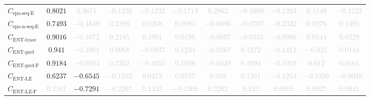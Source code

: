 \documentclass{standalone}
\newcommand{\enttracename}{\text{ENT-trace}}
\newcommand{\enttrace}{C_{\enttracename}}
\newcommand{\entprefixname}{\text{ENT-pref}}
\newcommand{\entprefix}{C_{\entprefixname}}
\newcommand{\entprefixflatname}{\text{ENT-pref-F}}
\newcommand{\entprefixflat}{C_{\entprefixflatname}}
\newcommand{\entlempelzivname}{\text{ENT-LZ}}
\newcommand{\entlempelziv}{C_{\entlempelzivname}}
\newcommand{\entlempelzivflatname}{\text{ENT-LZ-F}}
\newcommand{\entlempelzivflat}{C_{\entlempelzivflatname}}
\newcommand{\epasequenceename}{\text{epa-seq-E}}
\newcommand{\epasequencee}{C_{\epasequenceename}}
\newcommand{\epanormsequenceename}{\text{epa-n-seq-E}}
\newcommand{\epanormsequencee}{C_{\epanormsequenceename}}
\begin{document}
\begin{tabular}{lcccccccccc}
$\epasequencee$ & $0.8021$ & \textcolor{lightgray}{$0.3671$} & \textcolor{lightgray}{$-0.1236$} & \textcolor{lightgray}{$-0.1232$} & \textcolor{lightgray}{$-0.1713$} & \textcolor{lightgray}{$0.2862$} & \textcolor{lightgray}{$-0.1609$} & \textcolor{lightgray}{$-0.1283$} & \textcolor{lightgray}{$0.1148$} & \textcolor{lightgray}{$-0.1222$} \\ 
$\epanormsequencee$ & $0.7493$ & \textcolor{lightgray}{$-0.4849$} & \textcolor{lightgray}{$0.2288$} & \textcolor{lightgray}{$0.0268$} & \textcolor{lightgray}{$0.0983$} & \textcolor{lightgray}{$-0.0086$} & \textcolor{lightgray}{$-0.0707$} & \textcolor{lightgray}{$-0.2332$} & \textcolor{lightgray}{$0.0276$} & \textcolor{lightgray}{$0.1495$} \\ 
$\enttrace$ & $0.9016$ & \textcolor{lightgray}{$-0.1072$} & \textcolor{lightgray}{$0.2185$} & \textcolor{lightgray}{$0.1991$} & \textcolor{lightgray}{$0.0196$} & \textcolor{lightgray}{$-0.0697$} & \textcolor{lightgray}{$-0.0355$} & \textcolor{lightgray}{$-0.0986$} & \textcolor{lightgray}{$0.0144$} & \textcolor{lightgray}{$0.0229$} \\ 
$\entprefix$ & $0.941$ & \textcolor{lightgray}{$-0.1061$} & \textcolor{lightgray}{$0.0968$} & \textcolor{lightgray}{$-0.0837$} & \textcolor{lightgray}{$0.1234$} & \textcolor{lightgray}{$-0.0267$} & \textcolor{lightgray}{$0.1272$} & \textcolor{lightgray}{$-0.1412$} & \textcolor{lightgray}{$-0.021$} & \textcolor{lightgray}{$0.0144$} \\ 
$\entprefixflat$ & $0.9184$ & \textcolor{lightgray}{$-0.0594$} & \textcolor{lightgray}{$0.2352$} & \textcolor{lightgray}{$-0.1055$} & \textcolor{lightgray}{$0.1698$} & \textcolor{lightgray}{$-0.0449$} & \textcolor{lightgray}{$0.1094$} & \textcolor{lightgray}{$-0.1019$} & \textcolor{lightgray}{$0.012$} & \textcolor{lightgray}{$0.0161$} \\ 
$\entlempelziv$ & $0.6237$ & $-0.6545$ & \textcolor{lightgray}{$-0.1292$} & \textcolor{lightgray}{$0.0473$} & \textcolor{lightgray}{$0.0737$} & \textcolor{lightgray}{$0.018$} & \textcolor{lightgray}{$0.1261$} & \textcolor{lightgray}{$-0.1253$} & \textcolor{lightgray}{$-0.1356$} & \textcolor{lightgray}{$-0.0039$} \\ 
$\entlempelzivflat$ & \textcolor{lightgray}{$0.2161$} & $-0.7291$ & \textcolor{lightgray}{$-0.2267$} & \textcolor{lightgray}{$0.1343$} & \textcolor{lightgray}{$-0.1306$} & \textcolor{lightgray}{$0.3262$} & \textcolor{lightgray}{$0.243$} & \textcolor{lightgray}{$0.0005$} & \textcolor{lightgray}{$0.0027$} & \textcolor{lightgray}{$0.0941$} \\ 

\end{tabular}
\end{document}
